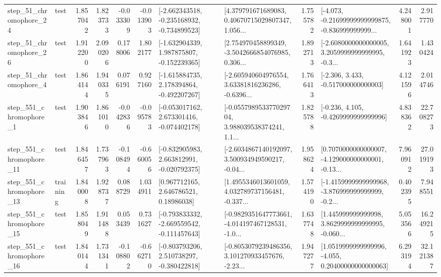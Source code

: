 \begin{tabular}{llrrrrllrlrr}
   step\_51\_chromophore\_24 &      test &      1.857042 &    1.823733 &     -0.033309 & -0.013903 &  [-2.662343518, -0.235168932, -0.734899523] &  [4.379791671689083, 0.40670715029807347, 1.056... &       1.755782 &  [-4.073, -0.21699999999999875, -0.836999999999... &            4.248001 &          2.917770 \\
   step\_51\_chromophore\_26 &      test &      1.912200 &    2.090206 &      0.178006 &  1.802177 &   [-1.632904339, 1.987875807, -0.152239365] &  [2.754970458899349, -3.5042666854076985, 0.306... &       1.892713 &  [-2.6080000000000005, 3.2059999999999995, -0.3... &            1.641923 &          1.430424 \\
    step\_51\_chromophore\_4 &      test &      1.864144 &    1.940335 &      0.076191 &  0.927160 &   [-1.615884735, 2.178394864, -0.492207267] &  [-2.605940604976554, 3.63381816236286, -0.6396... &       1.766413 &                [-2.306, 3.433, -0.517000000000003] &            4.121596 &          2.014746 \\
   step\_551\_chromophore\_1 &      test &      1.903846 &    1.861010 &     -0.042836 & -0.095783 &   [-0.053017162, 2.673301416, -0.074402178] &  [-0.055798953377029704, 3.988039538374241, 1.1... &       1.825788 &               [-0.236, 4.105, -0.4269999999999996] &            4.838362 &         22.708273 \\
  step\_551\_chromophore\_11 &      test &      1.846457 &    1.737963 &     -0.108494 & -0.660056 &   [-0.832905983, 2.663812991, -0.020792375] &  [-2.6034867140192097, 3.500934949590217, -0.04... &       1.958624 &  [0.7070000000000007, -4.129000000000001, -0.13... &            7.960912 &         27.019193 \\
  step\_551\_chromophore\_13 &  training &      1.840008 &    1.928737 &      0.088729 &  1.034911 &      [0.967712165, 2.646786521, 0.18986038] &  [1.4955346013601059, 4.032789737156481, -0.337... &       1.574190 &  [-1.4159999999999968, -3.876999999999999, -0.2... &            0.402395 &          7.948551 \\
  step\_551\_chromophore\_15 &      test &      1.858049 &    1.911488 &      0.053439 &  0.731627 &  [-0.793833332, -2.669559542, -0.111457643] &  [-0.9829351647773661, -4.014197467128531, -1.0... &       1.637748 &  [1.445999999999998, 3.8629999999999995, -0.060... &            5.053566 &         16.249215 \\
  step\_551\_chromophore\_16 &      test &      1.840144 &    1.731341 &     -0.108802 & -0.662710 &   [-0.803793206, 2.510738297, -0.380422818] &  [-0.8053079239486356, 3.101270933457676, -2.23... &       1.947277 &  [1.0519999999999996, -4.055, 0.20400000000000063] &            6.293194 &         32.121387 \\

\end{tabular}
